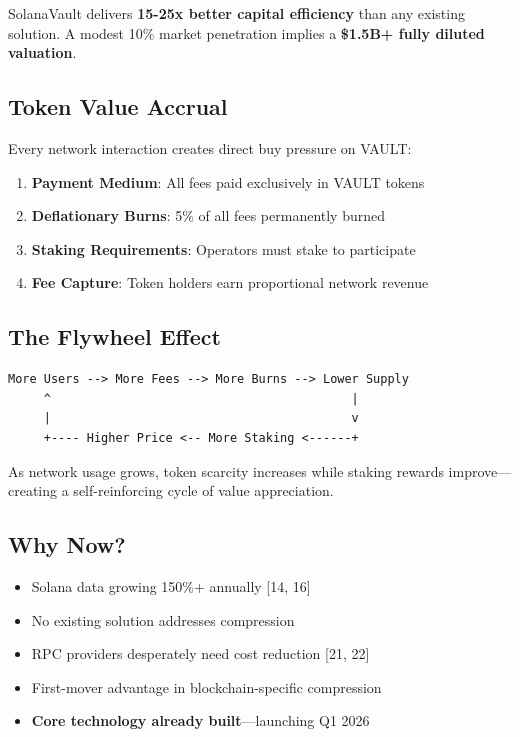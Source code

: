 \documentclass[12pt,a4paper]{article}
\begin{document}
\noindent SolanaVault delivers \textbf{15-25x better capital efficiency} than any existing solution. A modest 10\% market penetration implies a \textbf{\$1.5B+ fully diluted valuation}.

\subsection{Token Value Accrual}

Every network interaction creates direct buy pressure on VAULT:

\begin{enumerate}
    \item \textbf{Payment Medium}: All fees paid exclusively in VAULT tokens
    \item \textbf{Deflationary Burns}: 5\% of all fees permanently burned
    \item \textbf{Staking Requirements}: Operators must stake to participate
    \item \textbf{Fee Capture}: Token holders earn proportional network revenue
\end{enumerate}

\subsection{The Flywheel Effect}

\begin{verbatim}
More Users --> More Fees --> More Burns --> Lower Supply
     ^                                          |
     |                                          v
     +---- Higher Price <-- More Staking <------+
\end{verbatim}

As network usage grows, token scarcity increases while staking rewards improve—creating a self-reinforcing cycle of value appreciation.

\subsection{Why Now?}

\begin{itemize}
    \item Solana data growing 150\%+ annually [14, 16]
    \item No existing solution addresses compression
    \item RPC providers desperately need cost reduction [21, 22]
    \item First-mover advantage in blockchain-specific compression
    \item \textbf{Core technology already built}—launching Q1 2026
\end{itemize}
\end{document}
